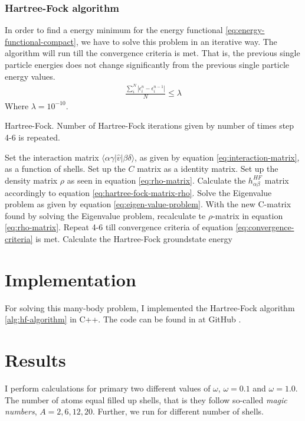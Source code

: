 \documentclass[11pt]{article}
\newcommand{\husk}[1]{\color{red} #1 \color{black}}
\begin{document}
\subsubsection{Hartree-Fock algorithm}
In order to find a energy minimum for the energy functional \eqref{eq:energy-functional-compact}, we have to solve this problem in an iterative way. The algorithm will run till the convergence criteria is met. That is, the previous single particle energies does not change significantly from the previous single particle energy values.
\begin{align}
	\frac{\sum_i^N|\epsilon^{n}_i - \epsilon^{n-1}_i|}{N} \leq \lambda
	\label{eq:convergence-criteria}
\end{align}
Where $\lambda=10^{-10}$.

\begin{algorithm}[H]
\caption{Hartree-Fock. Number of Hartree-Fock iterations given by number of times step 4-6 is repeated.}
\label{alg:hf-algorithm}
\begin{algorithmic}[1]
\State Set the interaction matrix $\langle \alpha \gamma |\hat{v}| \beta \delta \rangle$, as given by equation \eqref{eq:interaction-matrix}, as a function of shells.
\State Set up the $C$ matrix as a identity matrix.
\State Set up the density matrix $\rho$ as seen in equation \eqref{eq:rho-matrix}.
\State Calculate the $h^{HF}_{\alpha\beta}$ matrix accordingly to equation \eqref{eq:hartree-fock-matrix-rho}.
\State Solve the Eigenvalue problem as given by equation \eqref{eq:eigen-value-problem}.
\State With the new C-matrix found by solving the Eigenvalue problem, recalculate te $\rho$-matrix in equation \eqref{eq:rho-matrix}.
\State Repeat 4-6 till convergence criteria of equation \eqref{eq:convergence-criteria} is met.
\State Calculate the Hartree-Fock groundstate energy
\end{algorithmic}
\end{algorithm}

\section{Implementation}
For solving this many-body problem, I implemented the Hartree-Fock algorithm \ref{alg:hf-algorithm} in C++. The code can be found in at \husk{GitHub}.

\section{Results}
I perform calculations for primary two different values of $\omega$, $\omega=0.1$ and $\omega=1.0$. The number of atoms equal filled up shells, that is they follow so-called \textit{magic numbers}, $A = 2, 6, 12, 20$. Further, we run for different number of shells.
\end{document}
